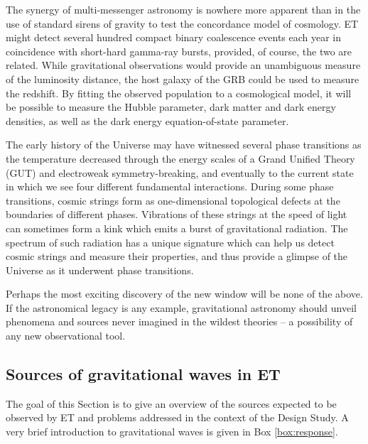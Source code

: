 The synergy of multi-messenger astronomy is nowhere more
apparent than in the use of standard sirens of gravity to
test the concordance model of cosmology.  ET might detect 
several hundred compact binary coalescence events each year 
in coincidence with short-hard gamma-ray bursts, provided, of 
course, the two are related.  While gravitational observations would
provide an unambiguous measure of the luminosity distance,
the host galaxy of the GRB could be used to measure the 
redshift. By fitting the observed population to a cosmological 
model, it will be possible to measure the Hubble parameter, 
dark matter and dark energy densities, as well as the 
dark energy equation-of-state parameter.

The early history of the Universe may have witnessed 
several phase transitions as the temperature decreased 
through the energy scales of a Grand Unified Theory (GUT) 
and electroweak symmetry-breaking, and eventually to the 
current state in which we see four different fundamental 
interactions. During some phase transitions, cosmic strings 
form as one-dimensional topological defects at the 
boundaries of different phases. Vibrations of these strings 
at the speed of light can sometimes form a kink which emits a 
burst of gravitational radiation. The spectrum of such radiation 
has a unique signature which can help us detect cosmic strings
and measure their properties, and thus provide a glimpse of the 
Universe as it underwent phase transitions.

Perhaps the most exciting discovery of the new window will 
be none of the above. If the astronomical legacy is any example, 
gravitational astronomy should unveil phenomena and 
sources never imagined in the wildest theories -- a possibility
of any new observational tool. 

\FloatBarrier
\subsection{Sources of gravitational waves in ET}

The goal of this Section is to give an overview of the sources
expected to be observed by ET and problems addressed in
the context of the Design Study. A very brief
introduction to gravitational waves is given in Box \ref{box:response}.

